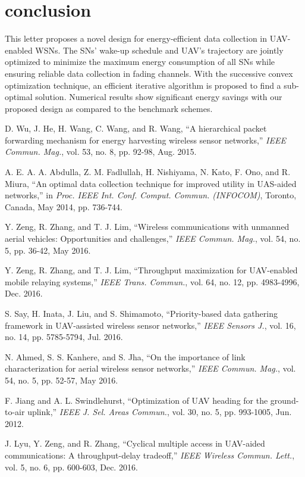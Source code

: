 \documentclass[journal]{IEEEtran}
\begin{document}
\section{conclusion}
This letter proposes a novel design for
energy-efficient data collection in UAV-enabled WSNs. The SNs' wake-up schedule and UAV's trajectory are jointly optimized to minimize the maximum energy consumption of all SNs while ensuring reliable data collection in fading channels. With the successive convex optimization
technique, an efficient iterative algorithm is proposed to find a sub-optimal solution. Numerical results show significant energy savings with our proposed design as compared to the benchmark schemes.


\begin{thebibliography}{1}
D. Wu, J. He, H. Wang, C. Wang, and R. Wang, ``A hierarchical packet forwarding mechanism for energy harvesting wireless sensor networks,'' {\em IEEE
Commun. Mag.}, vol. 53, no. 8, pp. 92-98, Aug. 2015.

A. E. A. A. Abdulla, Z. M. Fadlullah, H. Nishiyama, N. Kato, F. Ono, and R. Miura, ``An optimal data collection technique for improved utility in UAS-aided networks,'' in {\em Proc. IEEE
Int. Conf. Comput. Commun. (INFOCOM)}, Toronto, Canada, May 2014, pp. 736-744.

Y. Zeng, R. Zhang, and T. J. Lim, ``Wireless communications with unmanned aerial vehicles: Opportunities and challenges,'' {\em IEEE
Commun. Mag.}, vol. 54, no. 5, pp. 36-42, May 2016.

Y. Zeng, R. Zhang, and T. J. Lim, ``Throughput maximization for UAV-enabled mobile relaying systems,'' {\em IEEE Trans. Commun.}, vol. 64, no. 12, pp. 4983-4996, Dec. 2016.

S. Say, H. Inata, J. Liu, and S. Shimamoto, ``Priority-based data gathering framework in UAV-assisted wireless sensor networks,'' {\em IEEE Sensors J.}, vol. 16, no. 14, pp. 5785-5794, Jul. 2016.

N. Ahmed, S. S. Kanhere, and S. Jha, ``On the importance of link characterization for aerial wireless sensor networks,'' {\em IEEE
Commun. Mag.}, vol. 54, no. 5, pp. 52-57, May 2016.

F. Jiang and A. L. Swindlehurst, ``Optimization of UAV heading for the ground-to-air uplink,'' {\em IEEE J. Sel. Areas Commun.}, vol. 30, no. 5, pp. 993-1005, Jun. 2012.

J. Lyu, Y. Zeng, and R. Zhang, ``Cyclical multiple access in UAV-aided
communications: A throughput-delay tradeoff,'' {\em IEEE Wireless Commun.
Lett.}, vol. 5, no. 6, pp. 600-603, Dec. 2016.


\end{thebibliography}
\end{document}

